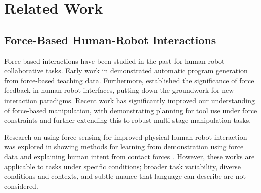 \section{Related Work}
\label{sec:Related Work}


\subsection{Force-Based Human-Robot Interactions}

Force-based interactions have been studied in the past for human-robot collaborative tasks.
Early work in \cite{asada1989automatic}  demonstrated automatic program generation from force-based teaching data. Furthermore, \cite{kazerooni1993human} established the significance of force feedback in human-robot interfaces, putting down the groundwork for new interaction paradigms. Recent work has significantly improved our understanding of force-based manipulation, with \cite{holladay2019force} demonstrating planning for tool use under force constraints and \cite{holladay2024robust} further extending this to robust multi-stage manipulation tasks.

Research on using force sensing for improved physical human-robot interaction was explored in \cite{haddadin2017robot}  showing methods for learning from demonstration using force data \cite{lee2015learning} and explaining human intent from contact forces \cite{peternel2018robot}. However, these works are applicable to tasks under specific conditions; broader task variability, diverse conditions and contexts, and subtle nuance that language can describe are not considered. %


